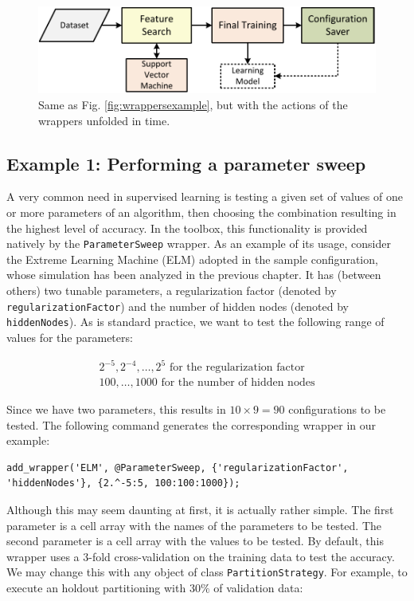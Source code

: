 \begin{figure}[t]
\centering
\includegraphics[scale=0.6]{./images/WrappersExampleUnfolded}
\caption{Same as Fig. \ref{fig:wrappersexample}, but with the actions of the wrappers unfolded in time.}
\label{fig:wrappersexample_unfolded}
\end{figure}

\subsection{Example 1: Performing a parameter sweep}
\label{sec:parametersweep}

A very common need in supervised learning is testing a given set of values of one or more parameters of an algorithm, then choosing the combination resulting in the highest level of accuracy. In the toolbox, this functionality is provided natively by the \verb|ParameterSweep| wrapper. As an example of its usage, consider the Extreme Learning Machine (ELM) adopted in the sample configuration, whose simulation has been analyzed in the previous chapter. It has (between others) two tunable parameters, a regularization factor (denoted by \verb|regularizationFactor|) and the number of hidden nodes (denoted by \verb|hiddenNodes|). As is standard practice, we want to test the following range of values for the parameters:

\begin{eqnarray}
2^{-5}, 2^{-4}, \dots, 2^{5} \text{ for the regularization factor}\\
100, \dots, 1000 \text{ for the number of hidden nodes}
\end{eqnarray}

\noindent Since we have two parameters, this results in $10 \times 9 = 90$ configurations to be tested. The following command generates the corresponding wrapper in our example:

\begin{lstlisting}
add_wrapper('ELM', @ParameterSweep, {'regularizationFactor', 'hiddenNodes'}, {2.^-5:5, 100:100:1000});
\end{lstlisting}

\noindent Although this may seem daunting at first, it is actually rather simple. The first parameter is a cell array with the names of the parameters to be tested. The second parameter is a cell array with the values to be tested. By default, this wrapper uses a $3$-fold cross-validation on the training data to test the accuracy. We may change this with any object of class \verb|PartitionStrategy|. For example, to execute an holdout partitioning with $30\%$ of validation data:

